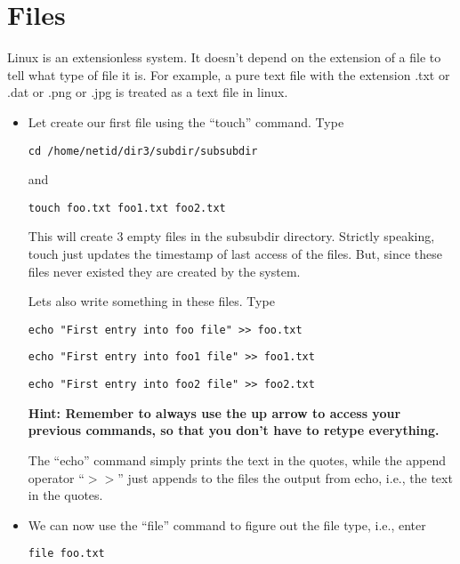 \documentclass[aps,showpacs,prd,notitlepage,preprintnumbers,amsmath,amssymb,letterpaper]{revtex4}
\begin{document}
\section{Files}

Linux is an extensionless system. It doesn't depend on the extension of
a file to tell what type of file it is. For example, a pure text file with
the extension .txt or .dat or .png or .jpg is treated as a text file in linux.

\begin{itemize}
\item Let create our first file using the ``touch'' command. Type

\begin{verbatim}
cd /home/netid/dir3/subdir/subsubdir
\end{verbatim}

and


\begin{verbatim}
touch foo.txt foo1.txt foo2.txt
\end{verbatim}

This will create 3 empty files in the subsubdir directory. Strictly
speaking, touch just updates the timestamp of last access of the
files.  But, since these files never existed they are created by the
system.

Lets also write something in these files. Type

\begin{verbatim}
echo "First entry into foo file" >> foo.txt
\end{verbatim}

\begin{verbatim}
echo "First entry into foo1 file" >> foo1.txt
\end{verbatim}

\begin{verbatim}
echo "First entry into foo2 file" >> foo2.txt
\end{verbatim}

{\bf Hint: Remember to always use the up arrow to access your previous
commands, so that you don't have to retype everything.}

The ``echo'' command simply prints the text in the quotes, while the
append operator ``$>>$'' just appends to the files the output from
echo, i.e., the text in the quotes.

\item We can now use the ``file'' command to figure out the file type, i.e.,
enter
  
\begin{verbatim}
file foo.txt
\end{verbatim}


\end{itemize}
\end{document}
